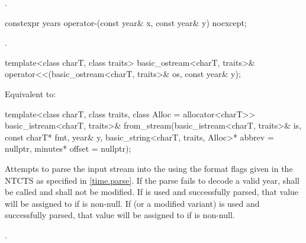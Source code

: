 \begin{itemdescr}
\pnum
\returns
{}.
\end{itemdescr}

%
\begin{itemdecl}
constexpr years operator-(const year& x, const year& y) noexcept;
\end{itemdecl}

\begin{itemdescr}
\pnum
\returns
{}.
\end{itemdescr}

%
\begin{itemdecl}
template<class charT, class traits>
  basic_ostream<charT, traits>&
    operator<<(basic_ostream<charT, traits>& os, const year& y);
\end{itemdecl}

\begin{itemdescr}
\pnum
\effects
Equivalent to:
\end{itemdescr}

%
\begin{itemdecl}
template<class charT, class traits, class Alloc = allocator<charT>>
  basic_istream<charT, traits>&
    from_stream(basic_istream<charT, traits>& is, const charT* fmt,
                year& y, basic_string<charT, traits, Alloc>* abbrev = nullptr,
                minutes* offset = nullptr);
\end{itemdecl}

\begin{itemdescr}
\pnum
\effects
Attempts to parse the input stream 
into the   using
the format flags given in the NTCTS 
as specified in \ref{time.parse}.
If the parse fails to decode a valid year,
 shall be called
and  shall not be modified.
If  is used and successfully parsed,
that value will be assigned to  if  is non-null.
If  (or a modified variant) is used and successfully parsed,
that value will be assigned to  if  is non-null.

\pnum
\returns
{}.
\end{itemdescr}

